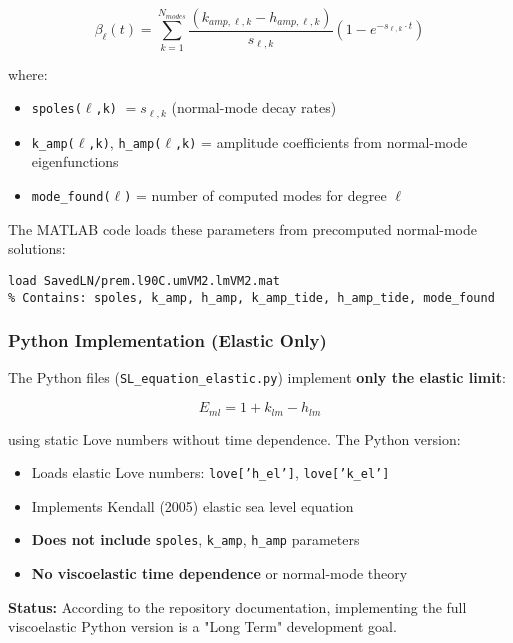 \documentclass{article}
\begin{document}
\begin{equation}
\boxed{
\beta_\ell(t) = \sum_{k=1}^{N_{modes}} \frac{(k_{amp,\ell,k} - h_{amp,\ell,k})}{s_{\ell,k}} \left(1 - e^{-s_{\ell,k} \cdot t}\right)
}
\end{equation}

where:
\begin{itemize}
\item {\tt spoles($\ell$,k)} $= s_{\ell,k}$ (normal-mode decay rates)
\item {\tt k\_amp($\ell$,k)}, {\tt h\_amp($\ell$,k)} = amplitude coefficients from normal-mode eigenfunctions
\item {\tt mode\_found($\ell$)} = number of computed modes for degree $\ell$
\end{itemize}

The MATLAB code loads these parameters from precomputed normal-mode solutions:
\begin{verbatim}
load SavedLN/prem.l90C.umVM2.lmVM2.mat
% Contains: spoles, k_amp, h_amp, k_amp_tide, h_amp_tide, mode_found
\end{verbatim}

\subsubsection{Python Implementation (Elastic Only)}

The Python files ({\tt SL\_equation\_elastic.py}) implement \textbf{only the elastic limit}:

\begin{equation}
E_{ml} = 1 + k_{lm} - h_{lm}
\end{equation}

using static Love numbers without time dependence. The Python version:
\begin{itemize}
\item  Loads elastic Love numbers: {\tt love['h\_el']}, {\tt love['k\_el']}
\item  Implements Kendall (2005) elastic sea level equation
\item  \textbf{Does not include} {\tt spoles}, {\tt k\_amp}, {\tt h\_amp} parameters
\item  \textbf{No viscoelastic time dependence} or normal-mode theory
\end{itemize}

\textbf{Status:} According to the repository documentation, implementing the full viscoelastic Python version is a "Long Term" development goal.
\end{document}
